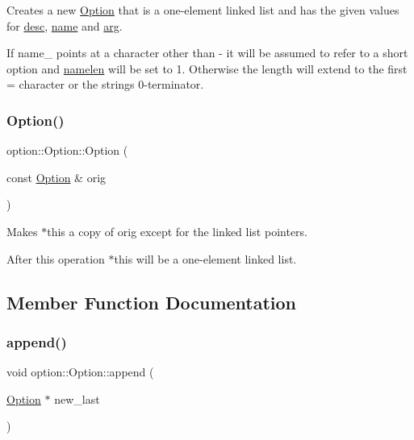 Creates a new \hyperlink{classoption_1_1Option}{Option} that is a one-\/element linked list and has the given values for \hyperlink{classoption_1_1Option_af8d664a7b5de1425008b1812a90a0c23}{desc}, \hyperlink{classoption_1_1Option_a02a76b4896abd22d0ba8514362261de9}{name} and \hyperlink{classoption_1_1Option_a402be734987458364b0f473acae36238}{arg}. 

If {\ttfamily name\+\_\+} points at a character other than \textquotesingle{}-\/\textquotesingle{} it will be assumed to refer to a short option and \hyperlink{classoption_1_1Option_a3aa2957b19ad5815873441b415d56050}{namelen} will be set to 1. Otherwise the length will extend to the first \textquotesingle{}=\textquotesingle{} character or the string\textquotesingle{}s 0-\/terminator. \mbox{\label{classoption_1_1Option_a4053240fecad1a3b1d8e4dc06b7aa8c4}} 
\subsubsection{\texorpdfstring{Option()}{Option()}\hspace{0.1cm}{\footnotesize\ttfamily [2/2]}}
{\footnotesize\ttfamily option\+::\+Option\+::\+Option (\begin{DoxyParamCaption}\item[{const \hyperlink{classoption_1_1Option}{Option} \&}]{orig }\end{DoxyParamCaption})\hspace{0.3cm}{\ttfamily [inline]}}



Makes {\ttfamily $\ast$this} a copy of {\ttfamily orig} except for the linked list pointers. 

After this operation {\ttfamily $\ast$this} will be a one-\/element linked list. 

\subsection{Member Function Documentation}
\mbox{\label{classoption_1_1Option_a59030822a1ec4e667e6c288d7e5ec961}} 
\subsubsection{\texorpdfstring{append()}{append()}}
{\footnotesize\ttfamily void option\+::\+Option\+::append (\begin{DoxyParamCaption}\item[{\hyperlink{classoption_1_1Option}{Option} $\ast$}]{new\+\_\+last }\end{DoxyParamCaption})\hspace{0.3cm}{\ttfamily [inline]}}



